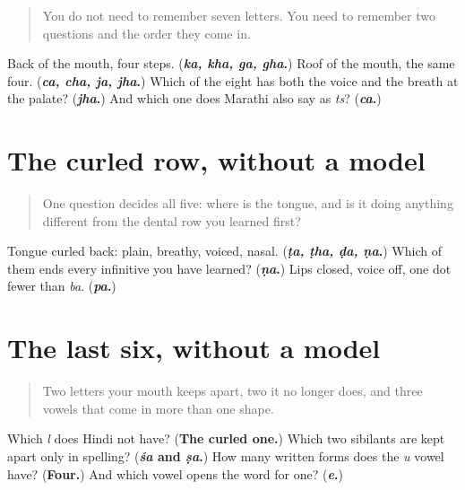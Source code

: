 \label{lesson:MR-R13-two-rows-r3}



\begin{quote}
You do not need to remember seven letters. You need to remember two questions and the order they come in.
\end{quote}

\begin{tcolorbox}[breakable,colback=teal!4,colframe=teal!35!black,title={Before you move on}]
Back of the mouth, four steps. (\textbf{\emph{ka, kha, ga, gha}.}) Roof of the mouth, the same four. (\textbf{\emph{ca, cha, ja, jha}.}) Which of the eight has both the voice and the breath at the palate? (\textbf{\emph{jha}.}) And which one does Marathi also say as \emph{ts}? (\textbf{\emph{ca}.})
\end{tcolorbox}
\section[curled row (vaḷlelī olī)]{The curled row, without a model}

\label{lesson:MR-R13-curled-r3}



\begin{quote}
One question decides all five: where is the tongue, and is it doing anything different from the dental row you learned first?
\end{quote}

\begin{tcolorbox}[breakable,colback=teal!4,colframe=teal!35!black,title={Before you move on}]
Tongue curled back: plain, breathy, voiced, nasal. (\textbf{\emph{ṭa, ṭha, ḍa, ṇa}.}) Which of them ends every infinitive you have learned? (\textbf{\emph{ṇa}.}) Lips closed, voice off, one dot fewer than \emph{ba}. (\textbf{\emph{pa}.})
\end{tcolorbox}
\section[last six (śevaṭce sahā)]{The last six, without a model}

\label{lesson:MR-R13-sibilants-r3}



\begin{quote}
Two letters your mouth keeps apart, two it no longer does, and three vowels that come in more than one shape.
\end{quote}

\begin{tcolorbox}[breakable,colback=teal!4,colframe=teal!35!black,title={Before you move on}]
Which \emph{l} does Hindi not have? (\textbf{The curled one.}) Which two sibilants are kept apart only in spelling? (\textbf{\emph{śa} and \emph{ṣa}.}) How many written forms does the \emph{u} vowel have? (\textbf{Four.}) And which vowel opens the word for one? (\textbf{\emph{e}.})
\end{tcolorbox}
